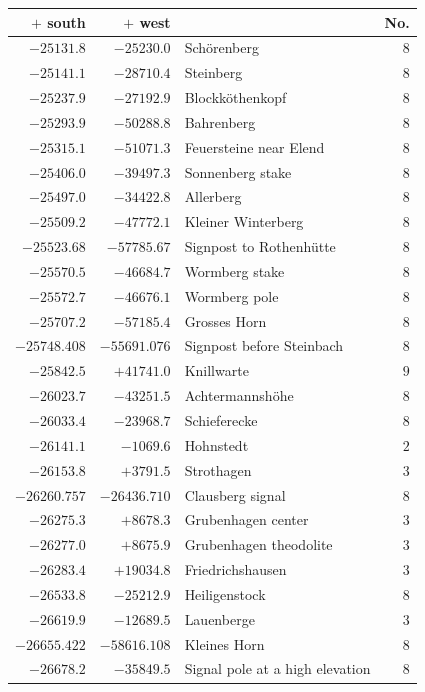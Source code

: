 \begin{center}\begingroup\fontsize{8}{9}\selectfont
\setlength{\tabcolsep}{4pt}
\begin{tabular}{r|r|p{170pt}|r}\hline
\(+\) south&\(+\) west&&No.\\\hline
\(-25131.8\)&\(-25230.0\)&Schörenberg&\(8\)\\
\(-25141.1\)&\(-28710.4\)&Steinberg&\(8\)\\
\(-25237.9\)&\(-27192.9\)&Blockköthenkopf&\(8\)\\
\(-25293.9\)&\(-50288.8\)&Bahrenberg&\(8\)\\
\(-25315.1\)&\(-51071.3\)&Feuersteine near Elend&\(8\)\\
\(-25406.0\)&\(-39497.3\)&Sonnenberg stake&\(8\)\\
\(-25497.0\)&\(-34422.8\)&Allerberg&\(8\)\\
\(-25509.2\)&\(-47772.1\)&Kleiner Winterberg&\(8\)\\
\(-25523.68\)&\(-57785.67\)&Signpost to Rothenhütte&\(8\)\\
\(-25570.5\)&\(-46684.7\)&Wormberg stake&\(8\)\\
\(-25572.7\)&\(-46676.1\)&Wormberg pole&\(8\)\\
\(-25707.2\)&\(-57185.4\)&Grosses Horn&\(8\)\\
\(-25748.408\)&\(-55691.076\)&Signpost before Steinbach&\(8\)\\
\(-25842.5\)&\(+41741.0\)&Knillwarte&\(9\)\\
\(-26023.7\)&\(-43251.5\)&Achtermannshöhe&\(8\)\\
\(-26033.4\)&\(-23968.7\)&Schieferecke&\(8\)\\
\(-26141.1\)&\(-1069.6\)&Hohnstedt&\(2\)\\
\(-26153.8\)&\(+3791.5\)&Strothagen&\(3\)\\
\(-26260.757\)&\(-26436.710\)&Clausberg signal&\(8\)\\
\(-26275.3\)&\(+8678.3\)&Grubenhagen center&\(3\)\\
\(-26277.0\)&\(+8675.9\)&Grubenhagen theodolite&\(3\)\\
\(-26283.4\)&\(+19034.8\)&Friedrichshausen&\(3\)\\
\(-26533.8\)&\(-25212.9\)&Heiligenstock&\(8\)\\
\(-26619.9\)&\(-12689.5\)&Lauenberge&\(3\)\\
\(-26655.422\)&\(-58616.108\)&Kleines Horn&\(8\)\\
\(-26678.2\)&\(-35849.5\)&Signal pole at a high elevation&\(8\)\\

\end{tabular}
\end{center}
